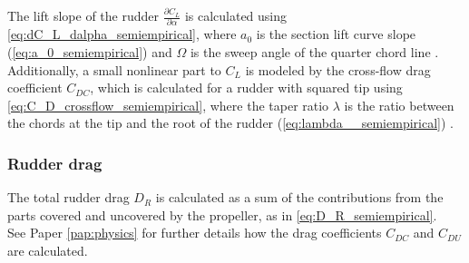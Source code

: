 The lift slope of the rudder $\frac{\partial C_L}{\partial \alpha}$ is calculated using \autoref{eq:dC_L_dalpha_semiempirical}, where $a_0$ is the section lift curve slope (\autoref{eq:a_0_semiempirical}) and $\Omega$ is the sweep angle of the quarter chord line \cite{lewisPrinciplesNavalArchitecture1989}.
\begin{equation}
    \label{eq:dC_L_dalpha_semiempirical}
    
\end{equation}
%
%
\begin{equation}
    \label{eq:a_0_semiempirical}
    
\end{equation}
%
Additionally, a small nonlinear part to $C_L$ is modeled by the cross-flow drag coefficient $C_{DC}$, which is calculated for a rudder with squared tip using \autoref{eq:C_D_crossflow_semiempirical}, where the taper ratio $\lambda$ is the ratio between the chords at the tip and the root of the rudder (\autoref{eq:lambda__semiempirical}) \cite{hughesTEMPESTLevel0Theory2011}. 
\begin{equation}
    \label{eq:C_D_crossflow_semiempirical}
    
\end{equation}
%
\begin{equation}
    \label{eq:lambda__semiempirical}
    
\end{equation}
%
%
\subsubsection{Rudder drag}
\label{sec:rudder_drag}
The total rudder drag $D_R$ is calculated as a sum of the contributions from the parts covered and uncovered by the propeller, as in \autoref{eq:D_R_semiempirical}.
\begin{equation}
    \label{eq:D_R_semiempirical}
    
\end{equation}
See Paper \ref{pap:physics} for further details how the drag coefficients $C_{DC}$ and $C_{DU}$ are calculated.

